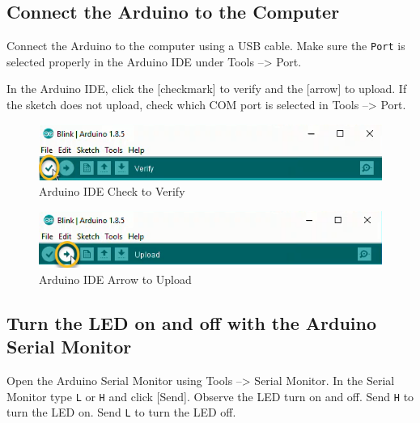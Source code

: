 \documentclass{book}
\makeatletter
\def\maxwidth{\ifdim\Gin@nat@width>\linewidth\linewidth
    \else\Gin@nat@width\fi}
\let\Oldincludegraphics\includegraphics
\renewcommand{\includegraphics}[1]{\Oldincludegraphics[width=.8\maxwidth]{#1}}
\makeatother
\begin{document}
    
        \subsection{Connect the Arduino to the
Computer}\label{connect-the-arduino-to-the-computer}
    




    
        Connect the Arduino to the computer using a USB cable. Make sure the
\lstinline!Port! is selected properly in the Arduino IDE under Tools
--\textgreater{} Port.

In the Arduino IDE, click the {[}checkmark{]} to verify and the
{[}arrow{]} to upload. If the sketch does not upload, check which COM
port is selected in Tools --\textgreater{} Port.

\begin{figure}
\centering
\includegraphics{images/Check_to_Verify.png}
\caption{Arduino IDE Check to Verify}
\end{figure}

\begin{figure}
\centering
\includegraphics{images/Arrow_to_Upload.png}
\caption{Arduino IDE Arrow to Upload}
\end{figure}
    




    
        \subsection{Turn the LED on and off with the Arduino Serial
Monitor}\label{turn-the-led-on-and-off-with-the-arduino-serial-monitor}
    




    
        Open the Arduino Serial Monitor using Tools --\textgreater{} Serial
Monitor. In the Serial Monitor type \lstinline!L! or \lstinline!H! and
click {[}Send{]}. Observe the LED turn on and off. Send \lstinline!H! to
turn the LED on. Send \lstinline!L! to turn the LED off.
\end{document}
